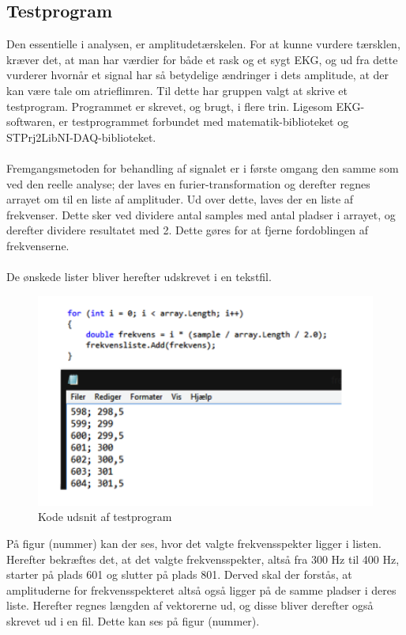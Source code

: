 \subsection{Testprogram}
Den essentielle i analysen, er amplitudetærskelen. For at kunne vurdere tærsklen, kræver det, at man har værdier for både et rask og et sygt EKG, og ud fra dette vurderer hvornår et signal har så betydelige ændringer i dets amplitude, at der kan være tale om atrieflimren. Til dette har gruppen valgt at skrive et testprogram. Programmet er skrevet, og brugt, i flere trin. Ligesom EKG-softwaren, er testprogrammet forbundet med matematik-biblioteket og STPrj2LibNI-DAQ-biblioteket. \\ \\
Fremgangsmetoden for behandling af signalet er i første omgang den samme som ved den reelle analyse; der laves en furier-transformation og derefter regnes arrayet om til en liste af amplituder. Ud over dette, laves der en liste af frekvenser. Dette sker ved dividere antal samples med antal pladser i arrayet, og derefter dividere resultatet med 2. Dette gøres for at fjerne fordoblingen af frekvenserne. \\ \\
De ønskede lister bliver herefter udskrevet i en tekstfil.

\begin{figure}[H]
	\centering
	\includegraphics[width=1\textwidth]{Figurer/Snip20150520_12}
	\caption{Kode udsnit af testprogram}
\end{figure}

På figur (nummer) kan der ses, hvor det valgte frekvensspekter ligger i listen. Herefter bekræftes det, at det valgte frekvensspekter, altså fra 300 Hz til 400 Hz, starter på plads 601 og slutter på plads 801. Derved skal der forstås, at amplituderne for frekvensspekteret altså også ligger på de samme pladser i deres liste. Herefter regnes længden af vektorerne ud, og disse bliver derefter også skrevet ud i en fil. Dette kan ses på figur (nummer). 


